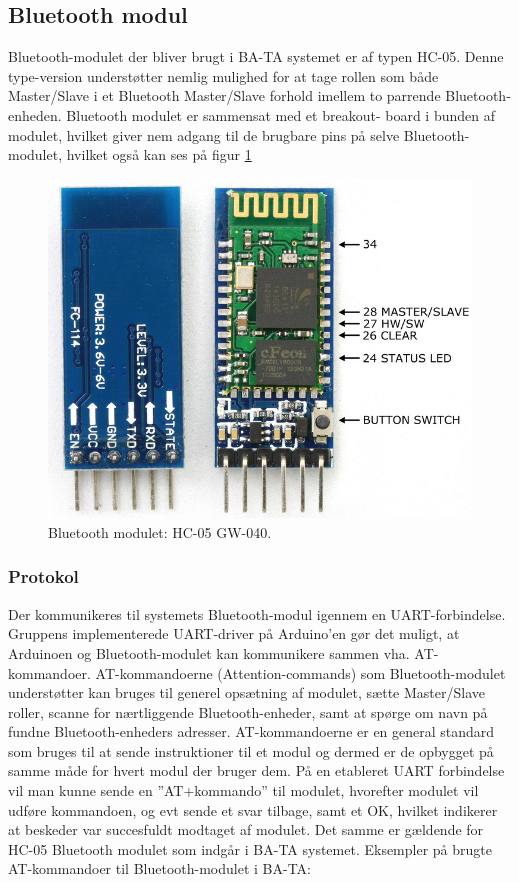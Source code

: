 \subsection{Bluetooth modul}

Bluetooth-modulet der bliver brugt i BA-TA systemet er af typen HC-05. Denne type-version understøtter nemlig mulighed for at tage rollen som både Master/Slave i et Bluetooth Master/Slave forhold imellem to parrende Bluetooth-enheden. Bluetooth modulet er sammensat med et breakout- board i bunden af modulet, hvilket giver nem adgang til de brugbare pins på selve Bluetooth-modulet, hvilket også kan ses på figur \ref{fig:bluetooth_modul}

\begin{figure}[H]
	\centering
	\includegraphics[width = 200 pt]{Img/modul.PNG}
	\caption{Bluetooth modulet: HC-05 GW-040.}
	\label{fig:bluetooth_modul}
\end{figure}

\subsubsection{Protokol}
Der kommunikeres til systemets Bluetooth-modul igennem en UART-forbindelse. Gruppens implementerede UART-driver på Arduino’en gør det muligt, at Arduinoen og Bluetooth-modulet kan kommunikere sammen vha. AT-kommandoer. 
AT-kommandoerne (Attention-commands) som Bluetooth-modulet understøtter kan bruges til generel opsætning af modulet, sætte Master/Slave roller, scanne for nærtliggende Bluetooth-enheder, samt at spørge om navn på fundne Bluetooth-enheders adresser. AT-kommandoerne er en general standard som bruges til at sende instruktioner til et modul og dermed er de opbygget på samme måde for hvert modul der bruger dem. På en etableret UART forbindelse vil man kunne sende en ”AT+kommando” til modulet, hvorefter modulet vil udføre kommandoen, og evt sende et svar tilbage, samt et OK, hvilket indikerer at beskeder var succesfuldt modtaget af modulet. Det samme er gældende for HC-05 Bluetooth modulet som indgår i BA-TA systemet.
Eksempler på brugte AT-kommandoer til Bluetooth-modulet i BA-TA:

